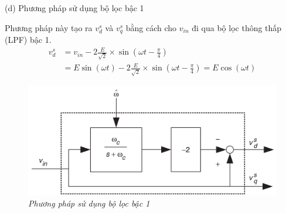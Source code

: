 \documentclass[11pt]{beamer}
\renewcommand{\label}[1]{%
			\gdef\sfname{sf:##1}}%
\begin{document}
	\begin{frame}[t]{(d) Phương pháp sử dụng bộ lọc bậc 1}
	
		Phương pháp này tạo ra $v_d^s$ và $v_q^s$ bằng cách cho $v_{in}$ đi qua bộ lọc thông thấp (LPF) bậc 1.	
		\begin{align*}
			v_d^s &= v_{in} - 2 \frac{E}{\sqrt{2}} \times \sin{(\omega t - \frac{\pi}{4} )} \\
			&=  E\sin({\omega t}) - 2 \frac{E}{\sqrt{2}} \times \sin{(\omega t - \frac{\pi}{4} )} = E\cos{(\omega t)} 
		\end{align*}
		\begin{figure}[h]
			\includegraphics[width=.7\textwidth]{Fig. 7 Method using first-order low-pass filter.PNG}
			\caption{\centering \textit{Phương pháp sử dụng bộ lọc bậc 1}}
			\label{fig:Phương pháp sử dụng bộ lọc bậc 1}
		\end{figure}
	
	\end{frame}
\end{document}
